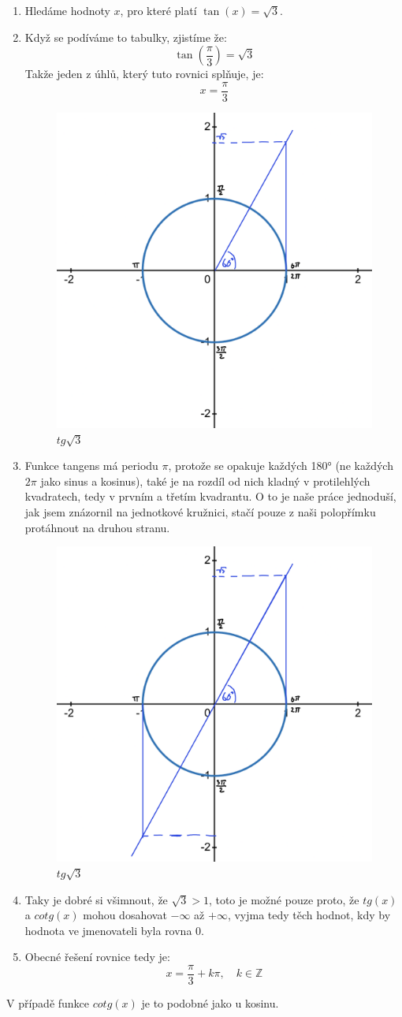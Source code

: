 \begin{enumerate}
    \item Hledáme hodnoty $x$, pro které platí $\tan(x) = \sqrt{3}$.

    \item Když se podíváme to tabulky, zjistíme že:
    \[
    \tan\left(\frac{\pi}{3}\right) = \sqrt{3}
    \]
    Takže jeden z úhlů, který tuto rovnici splňuje, je:
    \[
    x = \frac{\pi}{3}
    \]
    \begin{figure}[H]
        \centering
        \includegraphics[width=0.5\linewidth]{img/7_JednotkovaKruzniceTangens.png}
        \caption{$tg\sqrt{3}$} 
        \label{fig:Tangens jedné poloviny na jednotkové kružnici}
\end{figure}

    \item Funkce tangens má periodu $\pi$, protože se opakuje každých 180° (ne každých $2\pi$ jako sinus a kosinus), také je na rozdíl od nich kladný v protilehlých kvadratech, tedy v prvním a třetím kvadrantu. O to je naše práce jednoduší, jak jsem znázornil na jednotkové kružnici, stačí pouze z naši polopřímku protáhnout na druhou stranu.
    \begin{figure}[H]
        \centering
        \includegraphics[width=0.5\linewidth]{img/7_JednotkovaKruzniceTangensKomplet.png}
        \caption{$tg\sqrt{3}$} 
        \label{fig:Tangens jedné poloviny na jednotkové kružnici, dokončeno}
    \end{figure}
    \item Taky je dobré si všimnout, že $\sqrt{3} > 1$, toto je možné pouze proto, že $tg(x)$ a $cotg(x)$ mohou dosahovat $-\infty$ až $+\infty$, vyjma tedy těch hodnot, kdy by hodnota ve jmenovateli byla rovna $0$.

    \item Obecné řešení rovnice tedy je:
    \[
    x = \frac{\pi}{3} + k\pi, \quad k \in \mathbb{Z}
    \]

\end{enumerate}
V případě funkce $cotg(x)$ je to podobné jako u kosinu.